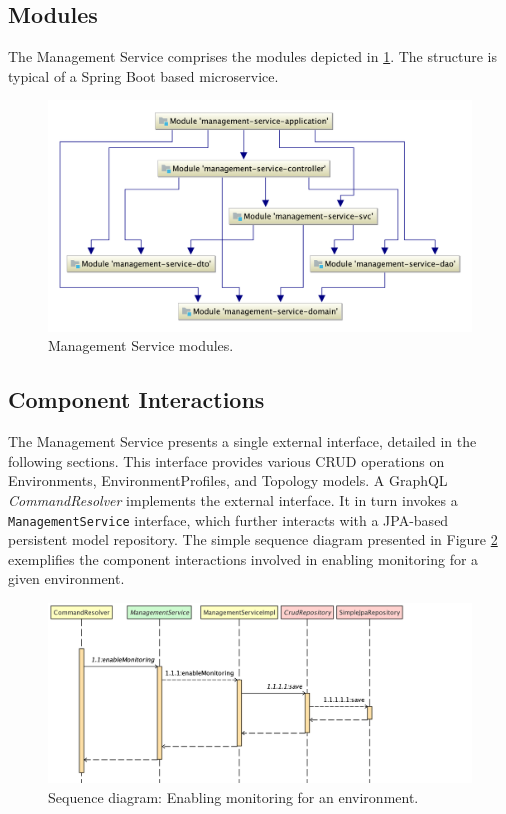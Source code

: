 \subsection{Modules}
The Management Service comprises the modules depicted in  \ref{mgmt_svc_modules}. The structure is typical of a Spring Boot based microservice.

\begin{figure}[H]
	\centering  
	\includegraphics[width=\linewidth]{figures/impl/mgmt/modules.png}
	\caption{Management Service modules.}
	\label{mgmt_svc_modules}
\end{figure}

\subsection{Component Interactions}
The Management Service presents a single external interface, detailed in the following sections. This interface provides various CRUD operations on Environments, EnvironmentProfiles, and Topology models. A GraphQL \textit {CommandResolver} implements the external interface. It in turn invokes a \texttt{ManagementService} interface, which further interacts with a JPA-based persistent model repository. The simple sequence diagram presented in Figure  \ref{mgmt_svc_seq_diagram} exemplifies the component interactions involved in enabling monitoring for a given environment.

 \begin{figure}[H]
	\centering  
	\includegraphics[width=\linewidth]{figures/impl/mgmt/enable_monitoring_seq.png}
	\caption{Sequence diagram: Enabling monitoring for an environment.}
	\label{mgmt_svc_seq_diagram}
\end{figure}

